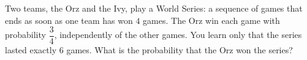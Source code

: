 Two teams, the Orz and the Ivy, play a World Series: a sequence of games that ends as soon as one team has won $4$ games. The Orz win each game with probability $\dfrac34$, independently of the other games. You learn only that the series lasted exactly $6$ games. What is the probability that the Orz won the series?

